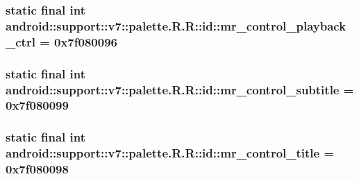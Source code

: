 \hypertarget{classandroid_1_1support_1_1v7_1_1palette_1_1_r_1_1id_71786ecf5680aa585cdd6604650d9f71}{
\subsubsection[{mr\_\-control\_\-playback\_\-ctrl}]{\setlength{\rightskip}{0pt plus 5cm}static final int android::support::v7::palette.R.R::id::mr\_\-control\_\-playback\_\-ctrl = 0x7f080096}}
\label{classandroid_1_1support_1_1v7_1_1palette_1_1_r_1_1id_71786ecf5680aa585cdd6604650d9f71}


\hypertarget{classandroid_1_1support_1_1v7_1_1palette_1_1_r_1_1id_f3b7a566024418de49fba023831ab064}{
\subsubsection[{mr\_\-control\_\-subtitle}]{\setlength{\rightskip}{0pt plus 5cm}static final int android::support::v7::palette.R.R::id::mr\_\-control\_\-subtitle = 0x7f080099}}
\label{classandroid_1_1support_1_1v7_1_1palette_1_1_r_1_1id_f3b7a566024418de49fba023831ab064}


\hypertarget{classandroid_1_1support_1_1v7_1_1palette_1_1_r_1_1id_3017d8541831033e764210a1ddaa0f4c}{
\subsubsection[{mr\_\-control\_\-title}]{\setlength{\rightskip}{0pt plus 5cm}static final int android::support::v7::palette.R.R::id::mr\_\-control\_\-title = 0x7f080098}}
\label{classandroid_1_1support_1_1v7_1_1palette_1_1_r_1_1id_3017d8541831033e764210a1ddaa0f4c}


